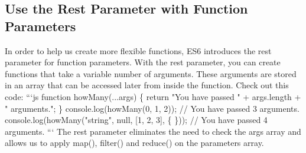 \documentclass{article}%
\begin{document}
%
\subsection{Use the Rest Parameter with Function Parameters}%
\label{subsec:UsetheRestParameterwithFunctionParameters}%
In order to help us create more flexible functions, ES6 introduces the rest parameter for function parameters. With the rest parameter, you can create functions that take a variable number of arguments. These arguments are stored in an array that can be accessed later from inside the function.\newline%
Check out this code:\newline%
```js\newline%
function howMany(...args) \{\newline%
  return "You have passed " + args.length + " arguments.";\newline%
\}\newline%
console.log(howMany(0, 1, 2)); // You have passed 3 arguments.\newline%
console.log(howMany("string", null, {[}1, 2, 3{]}, \{ \})); // You have passed 4 arguments.\newline%
```\newline%
The rest parameter eliminates the need to check the args array and allows us to apply map(), filter() and reduce() on the parameters array.\newline%

%
\end{document}
